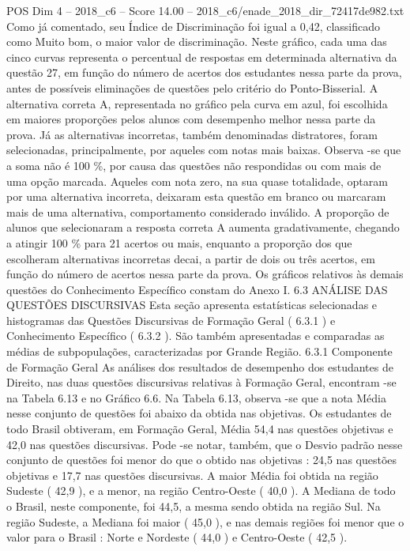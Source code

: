 \begin{textsample}{POS Dim 4 – 2018\_c6 – Score 14.00 – 2018\_c6/enade\_2018\_dir\_72417de982.txt}
Como já comentado, seu Índice de Discriminação foi igual a 0,42, classificado como Muito bom, o maior valor de discriminação.
Neste gráfico, cada uma das cinco curvas representa o percentual de respostas em determinada alternativa da questão 27, em função do número de acertos dos estudantes nessa parte da prova, antes de possíveis eliminações de questões pelo critério do Ponto-Bisserial.
A alternativa correta A, representada no gráfico pela curva em azul, foi escolhida em maiores proporções pelos alunos com desempenho melhor nessa parte da prova.
Já as alternativas incorretas, também denominadas distratores, foram selecionadas, principalmente, por aqueles com notas mais baixas.
Observa -se que a soma não é 100 \%, por causa das questões não respondidas ou com mais de uma opção marcada.
Aqueles com nota zero, na sua quase totalidade, optaram por uma alternativa incorreta, deixaram esta questão em branco ou marcaram mais de uma alternativa, comportamento considerado inválido.
A proporção de alunos que selecionaram a resposta correta A aumenta gradativamente, chegando a atingir 100 \% para 21 acertos ou mais, enquanto a proporção dos que escolheram alternativas incorretas decai, a partir de dois ou três acertos, em função do número de acertos nessa parte da prova.
Os gráficos relativos às demais questões do Conhecimento Específico constam do Anexo I. 6.3 ANÁLISE DAS QUESTÕES DISCURSIVAS Esta seção apresenta estatísticas selecionadas e histogramas das Questões Discursivas de Formação Geral ( 6.3.1 ) e Conhecimento Específico ( 6.3.2 ).
São também apresentadas e comparadas as médias de subpopulações, caracterizadas por Grande Região. 6.3.1 Componente de Formação Geral As análises dos resultados de desempenho dos estudantes de Direito, nas duas questões discursivas relativas à Formação Geral, encontram -se na Tabela 6.13 e no Gráfico 6.6.
Na Tabela 6.13, observa -se que a nota Média nesse conjunto de questões foi abaixo da obtida nas objetivas.
Os estudantes de todo Brasil obtiveram, em Formação Geral, Média 54,4 nas questões objetivas e 42,0 nas questões discursivas.
Pode -se notar, também, que o Desvio padrão nesse conjunto de questões foi menor do que o obtido nas objetivas : 24,5 nas questões objetivas e 17,7 nas questões discursivas.
A maior Média foi obtida na região Sudeste ( 42,9 ), e a menor, na região Centro-Oeste ( 40,0 ).
A Mediana de todo o Brasil, neste componente, foi 44,5, a mesma sendo obtida na região Sul.
Na região Sudeste, a Mediana foi maior ( 45,0 ), e nas demais regiões foi menor que o valor para o Brasil : Norte e Nordeste ( 44,0 ) e Centro-Oeste ( 42,5 ).

\end{textsample}
